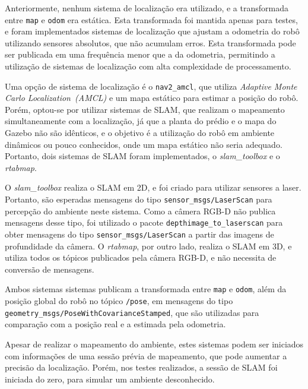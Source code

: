 \documentclass[repeatfields,xlists,xpacks,oneside,yearsonly]{ufrgscca}
\begin{document}
Anteriormente, nenhum sistema de localização era utilizado, e a transformada 
entre \texttt{map} e \texttt{odom} era estática.
Esta transformada foi mantida apenas para testes, e foram implementados sistemas
de localização que ajustam a odometria do robô utilizando sensores absolutos,
que não acumulam erros.
Esta transformada pode ser publicada em uma frequência menor que a da odometria,
permitindo a utilização de sistemas de localização com alta complexidade de 
processamento.


Uma opção de sistema de localização é o \texttt{nav2\_amcl}, que utiliza
\textit{Adaptive Monte Carlo Localization~(AMCL)} e um mapa estático para 
estimar a posição do robô.
Porém, optou-se por utilizar sistemas de SLAM, que realizam
o mapeamento simultaneamente com a localização, já que a planta 
do prédio e o mapa do Gazebo não são idênticos, e o objetivo é a utilização do
robô em ambiente dinâmicos ou pouco conhecidos, onde um mapa estático não seria 
adequado. Portanto, dois sistemas de SLAM foram implementados, 
o \textit{slam\_toolbox} e o \textit{rtabmap}.

O \textit{slam\_toolbox} realiza o SLAM em 2D, e foi criado para utilizar sensores
a laser. Portanto, são esperadas mensagens do tipo \texttt{sensor\_msgs/LaserScan}
para percepção do ambiente neste sistema. Como a câmera RGB-D não publica mensagens 
desse tipo, foi utilizado o pacote \texttt{depthimage\_to\_laserscan} para obter
mensagens do tipo \texttt{sensor\_msgs/LaserScan} a partir das imagens de profundidade
da câmera.
O \textit{rtabmap}, por outro lado, realiza o SLAM em 3D, e utiliza todos os
tópicos publicados pela câmera RGB-D, e não necessita de conversão de mensagens.

Ambos sistemas sistemas publicam a transformada entre \texttt{map} e \texttt{odom},
além da posição global do robô no tópico \texttt{/pose}, em mensagens do tipo 
\texttt{geometry\_msgs/PoseWithCovarianceStamped}, que são utilizadas para 
comparação com a posição real e a estimada pela odometria.

Apesar de realizar o mapeamento do ambiente, estes sistemas podem ser iniciados
com informações de uma sessão prévia de mapeamento, que pode aumentar
a precisão da localização. Porém, nos testes realizados, a sessão de SLAM
foi iniciada do zero, para simular um ambiente desconhecido.

\end{document}
